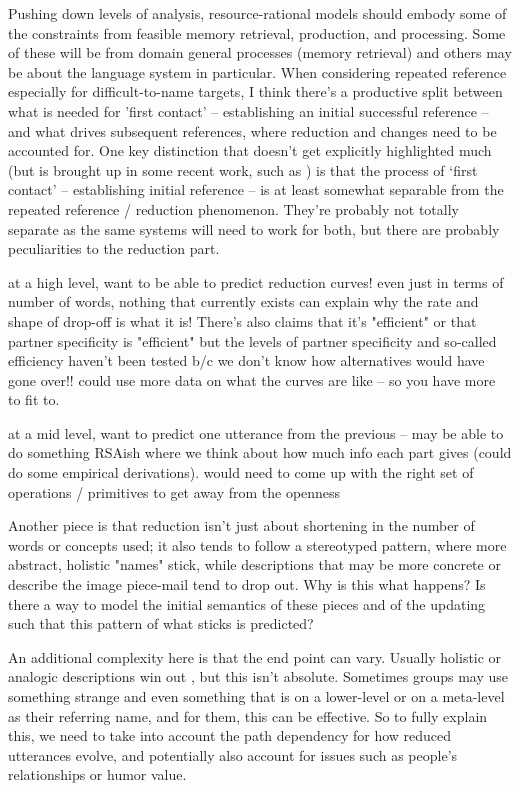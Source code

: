 \documentclass[]{article}
\begin{document}
	Pushing down levels of analysis, resource-rational models should embody some of the constraints from feasible memory retrieval, production, and processing. Some of these will be from domain general processes (memory retrieval) and others may be about the language system in particular. 
	When considering repeated reference especially for difficult-to-name targets, I think there's a productive split between what is needed for 'first contact' -- establishing an initial successful reference -- and what drives subsequent references, where reduction and changes need to be accounted for. One key distinction that doesn't get explicitly highlighted much (but is brought up in some recent work, such as \cite{leung2023}) is that the process of `first contact' -- establishing initial reference -- is at least somewhat separable from the repeated reference / reduction phenomenon. They're probably not totally separate as the same systems will need to work for both, but there are probably peculiarities to the reduction part. 
	
	at a high level, want to be able to predict reduction curves! even just in terms of number of words, nothing that currently exists can explain why the rate and shape of drop-off is what it is! There's also claims that it's "efficient" or that partner specificity is "efficient" but the levels of partner specificity and so-called efficiency haven't been tested b/c we don't know how alternatives would have gone over!! could use more data on what the curves are like -- so you have more to fit to. 
	
	at a mid level, want to predict one utterance from the previous -- may be able to do something RSAish where we think about how much info each part gives (could do some empirical derivations). would need to come up with the right set of operations / primitives to get away from the openness
	
	Another piece is that reduction isn't just about shortening in the number of words or concepts used; it also tends to follow a stereotyped pattern, where more abstract, holistic "names" stick, while descriptions that may be more concrete or describe the image piece-mail tend to drop out. Why is this what happens?  Is there a way to model the initial semantics of these pieces and of the updating such that this pattern of what sticks is predicted? 
	
	An additional complexity here is that the end point can vary. Usually holistic or analogic descriptions win out \cite{clark1986}, but this isn't absolute. Sometimes groups may use something strange and even something that is on a lower-level or on a meta-level as their referring name, and for them, this can be effective. So to fully explain this, we need to take into account the path dependency for how reduced utterances evolve, and potentially also account for issues such as people's relationships or humor value. 
	
\end{document}
